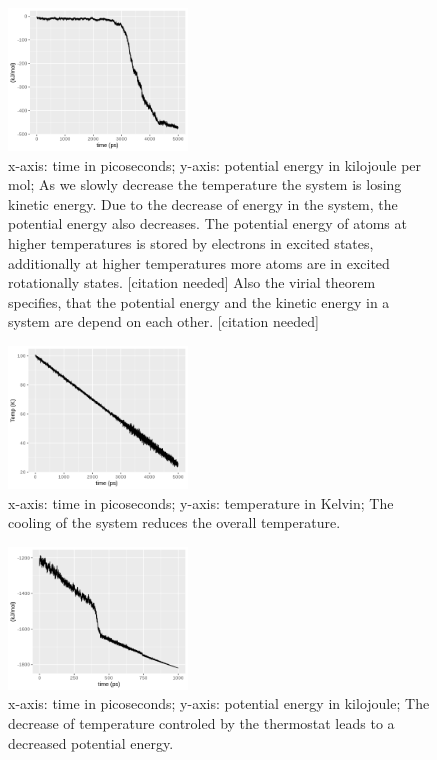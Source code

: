 \documentclass[10pt, a4paper, oneside, twocolumn]{article}
\begin{document}
\begin{figure}[t]
    \centering
    \includegraphics[width=180px]{plots/potential_energy.png}
    \caption{x-axis: time in picoseconds; y-axis: potential energy in kilojoule per mol; As we slowly decrease the temperature the system is losing kinetic energy. Due to the decrease of energy in the system, the potential energy also decreases.
The potential energy of atoms at higher temperatures is stored by electrons in excited states, additionally at higher temperatures more atoms are in excited rotationally states. [citation needed]
Also the virial theorem specifies, that the potential energy and the kinetic energy in a system are depend on each other. [citation needed]}
    \label{gas_to_liquid_potentialenergy}
\end{figure}

\begin{figure}[t]
    \centering
    \includegraphics[width=180px]{plots/temp_plot.png}
    \caption{x-axis: time in picoseconds; y-axis: temperature in Kelvin; The cooling of the system reduces the overall temperature.}
    \label{gas_to_liquid_temperature}
\end{figure}

\begin{figure}[t]
    \centering
    \includegraphics[width=180px]{plots//freezing/freezing_pot_en.png}
    \caption{x-axis: time in picoseconds; y-axis: potential energy in kilojoule; The decrease of temperature controled by the thermostat leads to a decreased potential energy.}
    \label{freezing_pot_en}
\end{figure}
\end{document}
